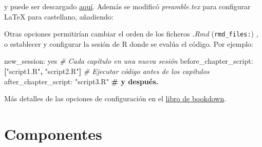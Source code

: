 \documentclass[]{book}
\newenvironment{Shaded}{\begin{snugshade}}{\end{snugshade}}
\newcommand{\KeywordTok}[1]{\textcolor[rgb]{0.13,0.29,0.53}{\textbf{#1}}}
\newcommand{\StringTok}[1]{\textcolor[rgb]{0.31,0.60,0.02}{#1}}
\newcommand{\CommentTok}[1]{\textcolor[rgb]{0.56,0.35,0.01}{\textit{#1}}}
\newcommand{\FunctionTok}[1]{\textcolor[rgb]{0.00,0.00,0.00}{#1}}
\newcommand{\BuiltInTok}[1]{#1}
\newcommand{\ExtensionTok}[1]{#1}
\newcommand{\AttributeTok}[1]{\textcolor[rgb]{0.77,0.63,0.00}{#1}}
\newcommand{\ErrorTok}[1]{\textcolor[rgb]{0.64,0.00,0.00}{\textbf{#1}}}
\newcommand{\NormalTok}[1]{#1}
\theoremstyle{definition}
\theoremstyle{definition}
\theoremstyle{definition}
\theoremstyle{remark}
\begin{document}
y puede ser descargado
\href{https://github.com/rubenfcasal/bookdown_intro/raw/master/_bookdown.yml}{aquí}.
Además se modificó \emph{preamble.tex} para configurar LaTeX para
castellano, añadiendo:

\begin{Shaded}
\end{Shaded}

Otras opciones permitirían cambiar el orden de los ficheros \emph{.Rmd}
(\texttt{rmd\_files:}) , o establecer y configurar la sesión de R donde
se evalúa el código. Por ejemplo:

\begin{Shaded}
\begin{Highlighting}[]
\FunctionTok{new_session:}\AttributeTok{ yes                                    }\CommentTok{# Cada capítulo en una nueva sesión}
\FunctionTok{before_chapter_script:}\AttributeTok{ }\KeywordTok{[}\StringTok{"script1.R"}\KeywordTok{,} \StringTok{"script2.R"}\KeywordTok{]}\AttributeTok{   }\CommentTok{# Ejecutar código antes de los capítulos}
\FunctionTok{after_chapter_script:}\AttributeTok{ }\StringTok{"script3.R"}\ErrorTok{                   # y después.}
\end{Highlighting}
\end{Shaded}

Más detalles de las opciones de configuración en el
\href{https://bookdown.org/yihui/bookdown/configuration.html\#configuration}{libro
de bookdown}.

\chapter{Componentes}\label{componentes}
\end{document}
